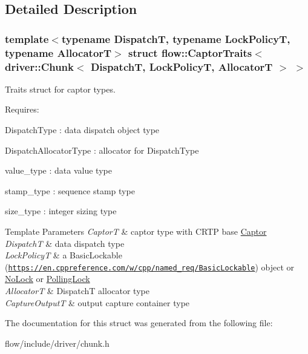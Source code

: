 \subsection{Detailed Description}
\subsubsection*{template$<$typename DispatchT, typename Lock\+PolicyT, typename AllocatorT$>$\newline
struct flow\+::\+Captor\+Traits$<$ driver\+::\+Chunk$<$ Dispatch\+T, Lock\+Policy\+T, Allocator\+T $>$ $>$}

Traits struct for captor types. 

Requires\+:
\begin{DoxyItemize}
\item {\ttfamily Dispatch\+Type} \+: data dispatch object type
\item {\ttfamily Dispatch\+Allocator\+Type} \+: allocator for {\ttfamily Dispatch\+Type}
\item {\ttfamily value\+\_\+type} \+: data value type
\item {\ttfamily stamp\+\_\+type} \+: sequence stamp type
\item {\ttfamily size\+\_\+type} \+: integer sizing type
\end{DoxyItemize}


\begin{DoxyTemplParams}{Template Parameters}
{\em CaptorT} & captor type with C\+R\+TP base {\ttfamily \hyperlink{classflow_1_1_captor}{Captor}}\\
\hline
{\em DispatchT} & data dispatch type \\
\hline
{\em Lock\+PolicyT} & a Basic\+Lockable (\href{https://en.cppreference.com/w/cpp/named_req/BasicLockable}{\tt https\+://en.\+cppreference.\+com/w/cpp/named\+\_\+req/\+Basic\+Lockable}) object or \hyperlink{structflow_1_1_no_lock}{No\+Lock} or \hyperlink{structflow_1_1_polling_lock}{Polling\+Lock} \\
\hline
{\em AllocatorT} & {\ttfamily DispatchT} allocator type \\
\hline
{\em Capture\+OutputT} & output capture container type \\
\hline
\end{DoxyTemplParams}


The documentation for this struct was generated from the following file\+:\begin{DoxyCompactItemize}
\item 
flow/include/driver/chunk.\+h\end{DoxyCompactItemize}
